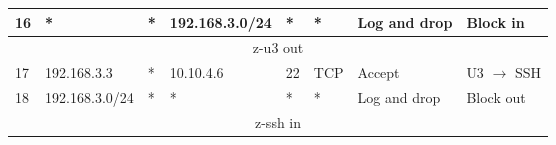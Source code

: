\documentclass[a4paper, 11pt, oneside]{article}
\begin{document}
\begin{table}[H]
{\begin{tabular}{|llllllll|}
\multicolumn{1}{|l|}{16}          & \multicolumn{1}{l|}{*}                                                            & \multicolumn{1}{l|}{*}                                                              & \multicolumn{1}{l|}{192.168.3.0/24}                                                    & \multicolumn{1}{l|}{*}                                                                   & \multicolumn{1}{l|}{*}                 & \multicolumn{1}{l|}{Log and drop}    & Block in                               \\ \hline
\multicolumn{8}{|c|}{{\color[HTML]{FE0000} z-u3 out}}                                                                                                                                                                                                                                                                                                                                                                                                                                                                    \\ \hline
\multicolumn{1}{|l|}{17}          & \multicolumn{1}{l|}{192.168.3.3}                                                  & \multicolumn{1}{l|}{*}                                                              & \multicolumn{1}{l|}{10.10.4.6}                                                         & \multicolumn{1}{l|}{22}                                                                  & \multicolumn{1}{l|}{TCP}               & \multicolumn{1}{l|}{Accept}          & U3 $\rightarrow$ SSH                   \\ \hline
\multicolumn{1}{|l|}{18}          & \multicolumn{1}{l|}{192.168.3.0/24}                                               & \multicolumn{1}{l|}{*}                                                              & \multicolumn{1}{l|}{*}                                                                 & \multicolumn{1}{l|}{*}                                                                   & \multicolumn{1}{l|}{*}                 & \multicolumn{1}{l|}{Log and drop}    & Block out                              \\ \hline
\multicolumn{8}{|c|}{{\color[HTML]{FE0000} z-ssh in}}                                                                                                                                                                                                                                                                                                                                                                                                                                                                    \\ \hline

\end{tabular}}
\end{table}
\end{document}
